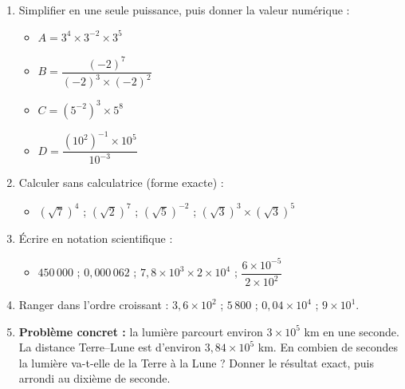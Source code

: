\documentclass[11pt]{article}
\begin{document}
\begin{exercice}
\begin{enumerate}
    \item Simplifier en une seule puissance, puis donner la valeur numérique :
    \begin{itemize}
        \item $A = 3^4 \times 3^{-2} \times 3^5$
        \item $B = \dfrac{(-2)^7}{(-2)^3 \times (-2)^2}$
        \item $C = (5^{-2})^3 \times 5^8$
        \item $D = \dfrac{(10^2)^{-1} \times 10^5}{10^{-3}}$
    \end{itemize}
    \item Calculer sans calculatrice (forme exacte) :
    \begin{itemize}
        \item $(\sqrt{7})^4$ \quad ; \quad $(\sqrt{2})^7$ \quad ; \quad $(\sqrt{5})^{-2}$ \quad ; \quad $(\sqrt{3})^3 \times (\sqrt{3})^5$
    \end{itemize}
    \item Écrire en notation scientifique :
    \begin{itemize}
        \item $450\,000$ \quad ; \quad $0,000\,062$ \quad ; \quad $7,8 \times 10^3 \times 2 \times 10^4$ \quad ; \quad $\dfrac{6 \times 10^{-5}}{2 \times 10^2}$
    \end{itemize}
    \item Ranger dans l'ordre croissant : $3,6 \times 10^2$ ; $5\,800$ ; $0,04 \times 10^4$ ; $9 \times 10^1$.
    \item \textbf{Problème concret :} la lumière parcourt environ $3 \times 10^5$ km en une seconde. La distance Terre--Lune est d'environ $3,84 \times 10^5$ km. En combien de secondes la lumière va-t-elle de la Terre à la Lune ? Donner le résultat exact, puis arrondi au dixième de seconde.
\end{enumerate}
\end{exercice}
\end{document}
